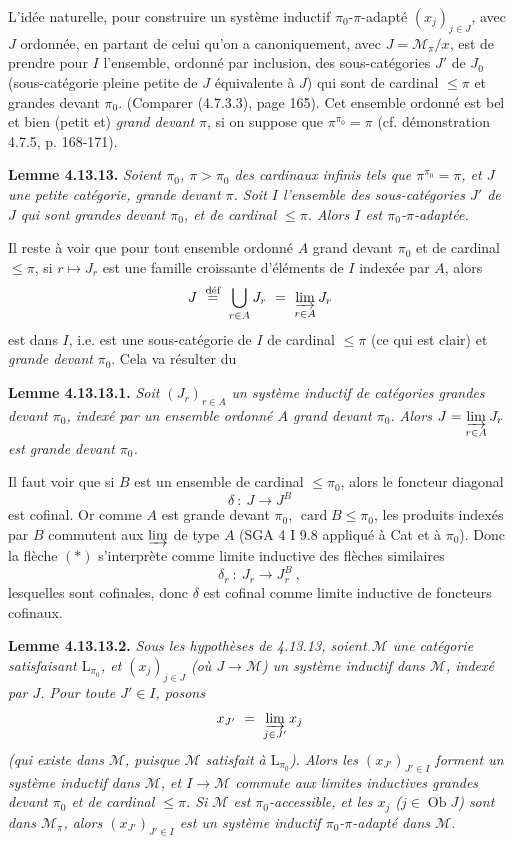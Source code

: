 \documentclass[11pt]{article}
\newcommand{\printedpage}[1]{\marginpar{\footnotesize p.~#1}}
\newcommand{\msp}[1]{\marginpar{\footnotesize [#1]}}
\newcommand{\ilim}{\varinjlim\limits}
\newcommand{\Ob}{\operatorname{Ob}}
\begin{document}
L'idée naturelle, pour construire un système inductif $\pi_0$-$\pi$-adapté $(x_j)_{j\in J}$, avec $J$ ordonnée, en partant de celui qu'on a canoniquement, avec $J = \mathcal{M}_\pi/x$, est de prendre pour $I$ l'ensemble, ordonné par inclusion, des sous-catégories $J'$ de $J_0$ (sous-catégorie pleine petite de $J$ équivalente à $J$) qui sont de cardinal $\leqslant \pi$ et grandes devant $\pi_0$. (Comparer (4.7.3.3), page 165). Cet ensemble ordonné est bel et bien (petit et) \textit{grand devant} $\pi$, si on suppose que $\pi^{\pi_0} = \pi$ (cf. démonstration 4.7.5, p. 168-171).

\msp{page 305}\noindent\textbf{Lemme 4.13.13.} \textit{Soient $\pi_0$, $\pi > \pi_0$ des cardinaux infinis tels que $\pi^{\pi_0} = \pi$, et $J$ une petite catégorie, grande devant $\pi$. Soit $I$ l'ensemble des sous-catégories $J'$ de $J$ qui sont grandes devant $\pi_0$, et de cardinal $\leqslant \pi$. Alors $I$ est $\pi_0$-$\pi$-adaptée.}

Il reste à voir que pour tout ensemble ordonné $A$ grand devant $\pi_0$ et de cardinal $\leqslant \pi$, si $r \longmapsto J_r$ est une famille croissante d'éléments de $I$ indexée par $A$, alors
\[
J \ \overset{\text{déf}}{=} \ \bigcup_{r\in A} J_r \ = \ \varinjlim_{r\in A} J_r
\]
est dans $I$, i.e. est une sous-catégorie de $I$ de cardinal $\leqslant \pi$ (ce qui est clair) et \textit{grande devant} $\pi_0$. Cela va résulter du

\printedpage{115}

\noindent\textbf{Lemme 4.13.13.1.} \textit{Soit $(J_r)_{r\in A}$ un système inductif de catégories grandes devant $\pi_0$, indexé par un ensemble ordonné $A$ grand devant $\pi_0$. Alors $J = \ilim_{r\in A} J_r$ est grande devant $\pi_0$.}

\msp{page 306}\noindent Il faut voir que si $B$ est un ensemble de cardinal $\leqslant \pi_0$, alors le foncteur diagonal
\[
\delta \ : \ J \longrightarrow J^B \tag*{$(*)$}
\]
est cofinal. Or comme $A$ est grande devant $\pi_0$, $\operatorname{card} B \leqslant \pi_0$, les produits indexés par $B$ commutent aux $\varinjlim$ de type $A$ (SGA 4 I 9.8 appliqué à Cat et à $\pi_0$). Donc la flèche $(*)$ s'interprète comme limite inductive des flèches similaires
\[
\delta_r \ : \ J_r \longrightarrow J_r^B \ , \tag*{$(**)$}
\]
lesquelles sont cofinales, donc $\delta$ est cofinal comme limite inductive de foncteurs cofinaux.

\noindent\textbf{Lemme 4.13.13.2.} \textit{Sous les hypothèses de 4.13.13, soient $\mathcal{M}$ une catégorie satisfaisant $\mathrm{L}_{\pi_0}$, et $(x_j)_{j\in J}$ (où $J \longrightarrow \mathcal{M}$) un système inductif dans $\mathcal{M}$, indexé par $J$. Pour toute $J' \in I$, posons}
\[
x_{J'} \ = \ \varinjlim_{j\in J'} x_j
\]
\msp{page 307}\textit{(qui existe dans $\mathcal{M}$, puisque $\mathcal{M}$ satisfait à $\mathrm{L}_{\pi_0}$). Alors les $(x_{J'})_{J'\in I}$ forment un système inductif dans $\mathcal{M}$, et $I \longrightarrow \mathcal{M}$ commute aux limites inductives grandes devant $\pi_0$ et de cardinal $\leqslant \pi$. Si $\mathcal{M}$ est $\pi_0$-accessible, et les $x_j$ ($j \in \Ob J$) sont dans $\mathcal{M}_\pi$, alors $(x_{J'})_{J'\in I}$ est un système inductif $\pi_0$-$\pi$-adapté dans $\mathcal{M}$.}
\end{document}
